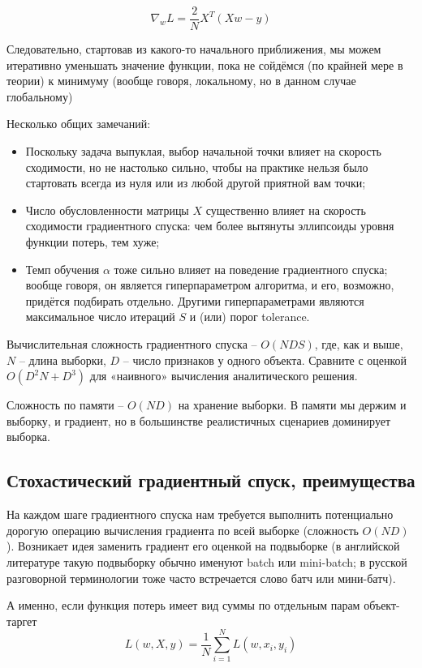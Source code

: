 \[  \nabla_w L = \frac{2}{N} X^T (X w - y) \]

Следовательно, стартовав из какого-то начального приближения, мы можем итеративно уменьшать значение функции,
пока не сойдёмся (по крайней мере в теории) к минимуму (вообще говоря, локальному, но в данном случае глобальному)

Несколько общих замечаний:

\begin{itemize}

    \item Поскольку задача выпуклая, выбор начальной точки влияет на скорость сходимости, но не настолько
    сильно, чтобы на практике нельзя было стартовать всегда из нуля или из любой другой приятной вам точки;
    \item Число обусловленности матрицы $X$ существенно влияет на скорость сходимости градиентного спуска: чем
    более вытянуты эллипсоиды уровня функции потерь, тем хуже;
    \item Темп обучения $\alpha$ тоже сильно влияет на поведение градиентного спуска; вообще говоря, он является
    гиперпараметром алгоритма, и его, возможно, придётся подбирать отдельно.
    Другими гиперпараметрами являются максимальное число итераций $S$ и (или) порог tolerance.

\end{itemize}

Вычислительная сложность градиентного спуска -- $O(NDS)$, где, как и выше, $N$ -- длина выборки, $D$ -- число
признаков у одного объекта.
Сравните с оценкой $O(D^2 N+D^3)$ для «наивного» вычисления аналитического решения.

Сложность по памяти -- $O(ND)$ на хранение выборки.
В памяти мы держим и выборку, и градиент, но в большинстве реалистичных сценариев доминирует выборка.

\subsection{Стохастический градиентный спуск, преимущества}

На каждом шаге градиентного спуска нам требуется выполнить потенциально дорогую операцию вычисления градиента по
всей выборке (сложность $O(ND)$).
Возникает идея заменить градиент его оценкой на подвыборке (в английской литературе такую подвыборку обычно именуют
batch или mini-batch; в русской разговорной терминологии тоже часто встречается слово батч или мини-батч).

А именно, если функция потерь имеет вид суммы по отдельным парам объект-таргет
\[ L(w,X,y) = \frac{1}{N} \sum_{i=1}^N L(w,x_i,y_i)\]

